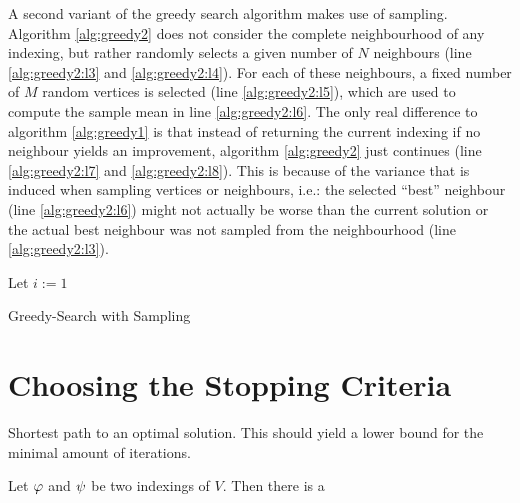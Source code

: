 A second variant of the greedy search algorithm makes use of sampling. Algorithm \ref{alg:greedy2} does not consider the complete neighbourhood of any indexing, but rather randomly selects a given number of $N$ neighbours (line \ref{alg:greedy2:l3} and \ref{alg:greedy2:l4}). For each of these neighbours, a fixed number of $M$ random vertices is selected (line \ref{alg:greedy2:l5}), which are used to compute the sample mean in line \ref{alg:greedy2:l6}. The only real difference to algorithm \ref{alg:greedy1} is that instead of returning the current indexing if no neighbour yields an improvement, algorithm \ref{alg:greedy2} just continues (line \ref{alg:greedy2:l7} and \ref{alg:greedy2:l8}). This is because of the variance that is induced when sampling vertices or neighbours, i.e.: the selected ``best'' neighbour (line \ref{alg:greedy2:l6}) might not actually be worse than the current solution or the actual best neighbour was not sampled from the neighbourhood (line \ref{alg:greedy2:l3}).

\begin{algorithm}[H]
    \SetAlgoLined
    \DontPrintSemicolon
    Let $i := 1$ \label{alg:greedy2:l1} \;
    \Return{$\idx$}  \label{alg:greedy2:l10} 
    \caption{Greedy-Search with Sampling} \label{alg:greedy2}
\end{algorithm}

\section{Choosing the Stopping Criteria}
Shortest path to an optimal solution. This should yield a lower bound for the minimal amount of iterations.

\begin{lemma}
    Let $\idx$ and $\psi$ be two indexings of $V$. Then there is a  
\end{lemma}